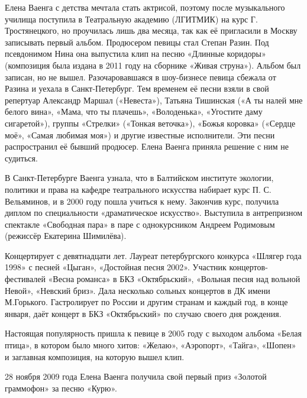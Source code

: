 Елена Ваенга с детства мечтала стать актрисой, поэтому после музыкального училища поступила в Театральную академию (ЛГИТМИК) на курс Г. Тростянецкого, но проучилась лишь два месяца, так как её пригласили в Москву записывать первый альбом. Продюсером певицы стал Степан Разин. Под псевдонимом Нина она выпустила клип на песню «Длинные коридоры» (композиция была издана в 2011 году на сборнике «Живая струна»). Альбом был записан, но не вышел. Разочаровавшаяся в шоу-бизнесе певица сбежала от Разина и уехала в Санкт-Петербург. Тем временем её песни взяли в свой репертуар Александр Маршал («Невеста»), Татьяна Тишинская («А ты налей мне белого вина», «Мама, что ты плачешь», «Володенька», «Угостите даму сигаретой»), группы «Стрелки» («Тонкая веточка»), «Божья коровка» («Сердце моё», «Самая любимая моя») и другие известные исполнители. Эти песни распространил её бывший продюсер. Елена Ваенга приняла решение с ним не судиться.

В Санкт-Петербурге Ваенга узнала, что в Балтийском институте экологии, политики и права на кафедре театрального искусства набирает курс П. С. Вельяминов, и в 2000 году пошла учиться к нему. Закончив курс, получила диплом по специальности «драматическое искусство». Выступила в антрепризном спектакле «Свободная пара» в паре с однокурсником Андреем Родимовым (режиссёр Екатерина Шимилёва).

Концертирует с девятнадцати лет. Лауреат петербургского конкурса «Шлягер года 1998» с песней «Цыган», «Достойная песня 2002». Участник концертов-фестивалей «Весна романса» в БКЗ «Октябрьский», «Вольная песня над вольной Невой», «Невский бриз». Дала несколько сольных концертов в ДК имени М.Горького. Гастролирует по России и другим странам и каждый год, в конце января, даёт концерт в БКЗ «Октябрьский» по случаю своего дня рождения.

Настоящая популярность пришла к певице в 2005 году с выходом альбома «Белая птица», в котором было много хитов: «Желаю», «Аэропорт», «Тайга», «Шопен» и заглавная композиция, на которую вышел клип.

28 ноября 2009 года Елена Ваенга получила свой первый приз «Золотой граммофон» за песню «Курю».

